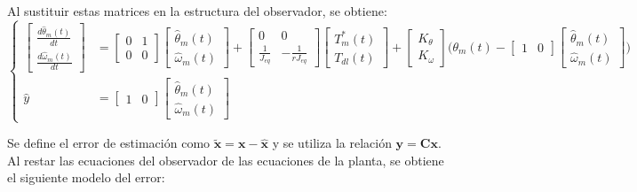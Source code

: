 \documentclass[blue,fullpaper]{ludusofficial}  %
\begin{document}
Al sustituir estas matrices en la estructura del observador, se obtiene:
\[
\left\{
\begin{aligned}
\begin{bmatrix} \frac{d \hat{\theta}_{m}(t) }{dt} \\ \frac{d \hat{\omega}_{m}(t) }{dt}  \end{bmatrix} 
 & = \begin{bmatrix} 0 & 1 \\0 & 0 \end{bmatrix} \begin{bmatrix} \hat{\theta}_{m}(t) \\ \hat{\omega}_{m}(t) \end{bmatrix} + \begin{bmatrix} 0 & 0 \\ \frac{1}{J_{eq}} & -\frac{1}{rJ_{eq}} \end{bmatrix} \begin{bmatrix} T^{*}_{m}(t) \\ T_{dl}(t) \end{bmatrix} + \begin{bmatrix} K_{\theta} \\ K_{\omega} \end{bmatrix} \Bigg( \theta_{m}(t) - \begin{bmatrix} 1 & 0 \end{bmatrix} \begin{bmatrix} \hat{\theta}_{m}(t) \\ \hat{\omega}_{m}(t) \end{bmatrix} \Bigg) \\
\hat{y} & = \begin{bmatrix} 1 & 0 \end{bmatrix} \begin{bmatrix} \hat{\theta}_{m}(t) \\ \hat{\omega}_{m}(t) \end{bmatrix}
\end{aligned}
\right.
\]

Se define el error de estimación como $\mathbf{\tilde{x}}=\mathbf{x}-\mathbf{\hat{x}}$ y se utiliza la relación $\mathbf{y} = \mathbf{C}\mathbf{x}$. Al restar las ecuaciones del observador %
de las ecuaciones de la planta, %
se obtiene el siguiente modelo del error:
\end{document}
